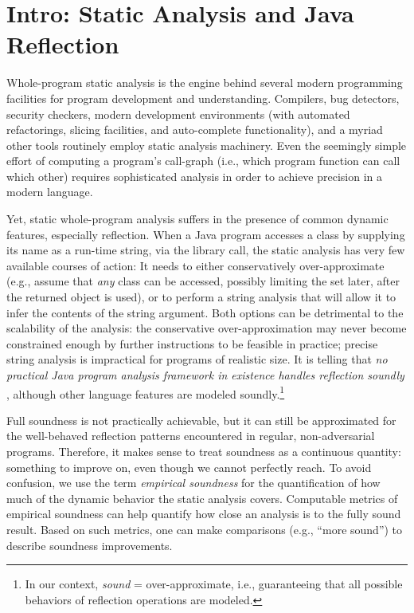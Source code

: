 \section{Intro: Static Analysis and Java Reflection}
\label{reflection/sec:intro}

Whole-program static analysis is the engine behind several modern
programming facilities for program development and
understanding. Compilers, bug detectors, security checkers, modern
development environments (with automated refactorings, slicing
facilities, and auto-complete functionality), and a myriad other tools
routinely employ static analysis machinery. Even the seemingly simple
effort of computing a program's call-graph (i.e., which program
function can call which other) requires sophisticated analysis in
order to achieve precision in a modern language.

Yet, static whole-program analysis suffers in the presence of common
dynamic features, especially reflection. When a Java program accesses
a class by supplying its name as a run-time string, via the
 library call, the static analysis has
very few available courses of action: It needs to either
conservatively over-approximate (e.g., assume that \emph{any} class
can be accessed, possibly limiting the set later, after the returned
object is used), or to perform a string analysis that will allow it to
infer the contents of the  string argument. Both options
can be detrimental to the scalability of the analysis: the
conservative over-approximation may never become constrained enough by
further instructions to be feasible in practice; precise string
analysis is impractical for programs of realistic size.  It is telling
that \emph{no practical Java program analysis framework in existence
  handles reflection soundly} \cite{soundiness15}, although other
language features are modeled soundly.\footnote{In our context,
  \emph{sound} = over-approximate, i.e., guaranteeing that all
  possible behaviors of reflection operations are modeled.}

%
Full soundness is not practically achievable, but it can still be
approximated for the well-behaved reflection patterns encountered in
regular, non-adversarial programs.  Therefore, it makes sense to treat
soundness as a continuous quantity: something to improve on, even
though we cannot perfectly reach.  To avoid confusion, we use the term
\emph{empirical soundness} for the quantification of how much of the
dynamic behavior the static analysis covers. Computable metrics of
empirical soundness can help quantify how close an analysis is to the
fully sound result. Based on such metrics, one can make comparisons
(e.g., ``more sound'') to describe soundness improvements.

